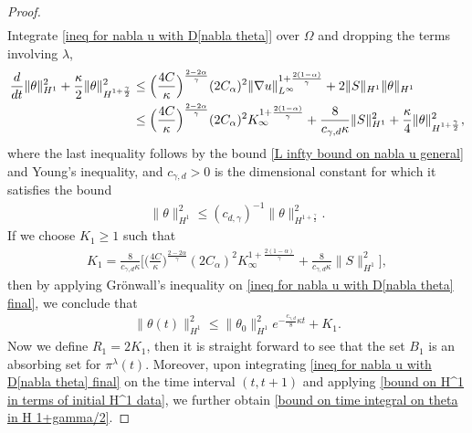 \documentclass[reqno]{amsart}%
\theoremstyle{definition}
\theoremstyle{remark}
\numberwithin{equation}{section}
\newcommand{\1}{\mathbf{1}}
\newcommand{\K}{K_{\infty}}
\newcommand{\pin}{\pi^{\lambda}}
\numberwithin{equation}{section}
\numberwithin{theorem}{section}
\numberwithin{figure}{section}
\begin{document}
\begin{proof}
\begin{align}
\end{align}
Integrate \eqref{ineq for nabla u with D[nabla theta]} over $\Omega$ and dropping the terms involving $\lambda$,
\begin{align}\label{ineq for nabla u with D[nabla theta] final}
\frac{d}{dt}\|\theta\|^2_{H^1}+\frac{\kappa}{2}\|\theta\|^2_{H^{1+\frac{\gamma}{2}}}
&\le\Big(\frac{4C}{\kappa}\Big)^\frac{2-2\alpha}{\gamma}(2C_\alpha)^2\|\nabla u\|^{1+\frac{2(1-\alpha)}{\gamma}}_{L^\infty}+2\|S\|_{H^1}\|\theta\|_{H^1}\notag\\
&\le\Big(\frac{4C}{\kappa}\Big)^\frac{2-2\alpha}{\gamma}(2C_\alpha)^2\K^{1+\frac{2(1-\alpha)}{\gamma}}+\frac{8}{c_{\gamma,d}\kappa}\|S\|^2_{H^1}+\frac{\kappa}{4}\|\theta\|^2_{H^{1+\frac{\gamma}{2}}},
\end{align}
where the last inequality follows by the bound \eqref{L infty bound on nabla u general} and Young's inequality, and $c_{\gamma,d}>0$ is the dimensional constant for which it satisfies the bound
\begin{align}\label{def of c gamma d}
\|\theta\|^2_{H^1}\le(c_{d,\gamma})^{-1}\|\theta\|^2_{H^{1+\frac{\gamma}{2}}}.
\end{align}
If we choose $K_1\ge1$ such that
\begin{align*}
K_1=\frac{8}{c_{\gamma,d}\kappa}\Big[\Big(\frac{4C}{\kappa}\Big)^\frac{2-2\alpha}{\gamma}(2C_\alpha)^2\K^{1+\frac{2(1-\alpha)}{\gamma}}+\frac{8}{c_{\gamma,d}\kappa}\|S\|^2_{H^1}\Big],
\end{align*}
then by applying Gr\"{o}nwall's inequality on \eqref{ineq for nabla u with D[nabla theta] final}, we conclude that
\begin{align}\label{bound on H^1 in terms of initial H^1 data}
\|\theta(t)\|^2_{H^1}\le\|\theta_0\|^2_{H^1}e^{-\frac{c_{\gamma,d}}{8}\kappa t}+K_1.
\end{align}
Now we define $R_1=2K_1$, then it is straight forward to see that the set $B_1$ is an absorbing set for $\pin(t)$. Moreover, upon integrating \eqref{ineq for nabla u with D[nabla theta] final} on the time interval $(t,t+1)$ and applying \eqref{bound on H^1 in terms of initial H^1 data}, we further obtain \eqref{bound on time integral on theta in H 1+gamma/2}.


\end{proof}
\end{document}
